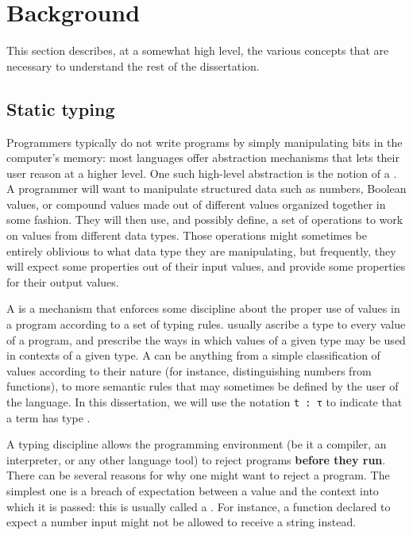 \chapter{Background}

This section describes, at a somewhat high level, the various concepts that are
necessary to understand the rest of the dissertation.

\section{Static typing}
\label{static-typing}



Programmers typically do not write programs by simply manipulating bits in the
computer's memory: most languages offer abstraction mechanisms that lets their
user reason at a higher level.  One such high-level abstraction is the notion of
a .  A programmer will want to manipulate structured data such
as numbers, Boolean values, or compound values made out of different values
organized together in some fashion.  They will then use, and possibly define, a
set of operations to work on values from different data types.  Those operations
might sometimes be entirely oblivious to what data type they are manipulating,
but frequently, they will expect some properties out of their input values, and
provide some properties for their output values.

A  is a mechanism that enforces some discipline about the
proper use of values in a program according to a set of typing rules.
 usually ascribe a type to every value of a program, and
prescribe the ways in which values of a given type may be used in contexts of a
given type.  A  can be anything from a simple classification of
values according to their nature (for instance, distinguishing numbers from
functions), to more semantic rules that may sometimes be defined by the user of
the language.  In this dissertation, we will use the notation \texttt{t
: τ} to indicate that a term  has type .

A  typing discipline allows the programming environment (be it a
compiler, an interpreter, or any other language tool) to reject programs
\textbf{before they run}.  There can be several reasons for why one might want
to reject a program.  The simplest one is a breach of expectation between a
value and the context into which it is passed: this is usually called a
.  For instance, a function declared to expect a number input
might not be allowed to receive a string instead.

